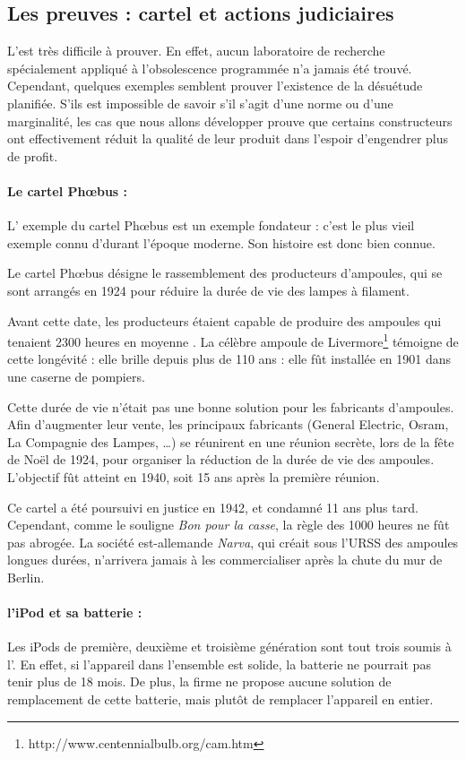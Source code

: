 \subsection{Les preuves : cartel et actions judiciaires}
\label{c1/s1/ss1:preuve_op}

L'\op est très difficile à prouver. En effet, aucun laboratoire de recherche spécialement appliqué à l'obsolescence programmée n'a jamais été trouvé. Cependant, quelques exemples semblent prouver l'existence de la désuétude planifiée. S'ils est impossible de savoir s'il s'agit d'une norme ou d'une marginalité, les cas que nous allons développer prouve que certains constructeurs ont effectivement réduit la qualité de leur produit dans l'espoir d'engendrer plus de profit. 

\paragraph*{Le cartel Phœbus : } L' exemple du cartel Phœbus est un exemple fondateur : c'est le plus vieil exemple connu d'\op durant l'époque moderne. Son histoire est donc bien connue. 

Le cartel Phœbus désigne le rassemblement des producteurs d'ampoules, qui se sont arrangés en 1924 pour réduire la durée de vie des lampes à filament. 

Avant cette date, les producteurs étaient capable de produire des ampoules qui tenaient 2300 heures en moyenne \cite{opes_PHOEBUS}. La célèbre ampoule de Livermore\footnote{http://www.centennialbulb.org/cam.htm} témoigne de cette longévité : elle brille depuis plus de 110 ans : elle fût installée en 1901 dans une caserne de pompiers. 

Cette durée de vie n'était pas une bonne solution pour les fabricants d'ampoules. Afin d'augmenter leur vente,  les principaux fabricants (General Electric, Osram, La Compagnie des Lampes, \dots) se réunirent en une réunion secrète, lors de la fête de Noël de 1924, pour organiser la  réduction de la durée de vie des ampoules. L'objectif fût atteint  en 1940, soit 15 ans après la première réunion. 

Ce cartel a été poursuivi en justice en 1942, et condamné 11 ans plus tard. Cependant, comme le souligne \textit{Bon pour la casse}, la règle des 1000 heures ne fût pas abrogée. La société est-allemande \textit{Narva}, qui créait sous l'URSS des ampoules longues durées, n'arrivera jamais à les commercialiser après la chute du mur de Berlin. 

\paragraph*{l'iPod et sa batterie : } Les iPods de première, deuxième et troisième génération sont tout trois soumis à l'\op. En effet, si l'appareil dans l'ensemble est solide, la batterie ne pourrait pas tenir plus de 18 mois\cite{cec-zevRapportObsProg}. De plus, la firme ne propose aucune solution de remplacement de cette batterie, mais plutôt de remplacer l'appareil en entier. 

